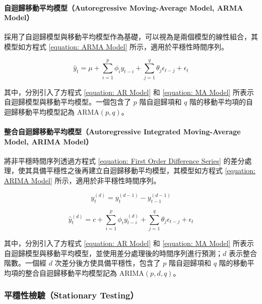 \paragraph{自迴歸移動平均模型（Autoregressive Moving-Average Model, ARMA Model）}

採用了自迴歸模型與移動平均模型作為基礎，可以視為是兩個模型的線性組合，其模型如方程式 \eqref{equation: ARMA Model} 所示，適用於平穩性時間序列。

\begin{equation}\label{equation: ARMA Model}
  \hat{y}_{t} = \mu + \sum_{i = 1}^{p} \phi_{i} y_{t-i} + \sum_{j = 1}^{q} \theta_{j} \epsilon_{t-j} + \epsilon_{t}
\end{equation}

其中，分別引入了方程式 \eqref{equation: AR Model} 和 \eqref{equation: MA Model} 所表示自迴歸模型與移動平均模型。一個包含了 $p$ 階自迴歸項和 $q$ 階的移動平均項的自迴歸移動平均模型記為 $\text{ARMA} (p, q)$。

\paragraph{整合自迴歸移動平均模型（Autoregressive Integrated Moving-Average Model, ARIMA Model）}

將非平穩時間序列透過方程式 \eqref{equation: First Order Difference Series} 的差分處理，使其具備平穩性之後再建立自迴歸移動平均模型，其模型如方程式 \eqref{equation: ARIMA Model} 所示，適用於非平穩性時間序列。

\begin{equation}\label{equation: First Order Difference Series}
  {y}_{t}^{(d)} = y_{t}^{(d-1)} - y_{t-1}^{(d-1)}
\end{equation}

\begin{equation}\label{equation: ARIMA Model}
  \hat{y}_{t}^{(d)} = c + \sum_{i = 1}^{p} \phi_{i} {y}_{t-i}^{(d)} + \sum_{j = 1}^{q} \theta_{j} \epsilon_{t-j} + \epsilon_{t}
\end{equation}

其中，分別引入了方程式 \eqref{equation: AR Model} 和 \eqref{equation: MA Model} 所表示自迴歸模型與移動平均模型，並使用差分處理後的時間序列進行預測；$d$ 表示整合階數。一個經 $d$ 次差分後方使具備平穩性，包含了 $p$ 階自迴歸項和 $q$ 階的移動平均項的整合自迴歸移動平均模型記為 $\text{ARIMA} (p, d, q)$。

\subsubsection{平穩性檢驗（Stationary Testing）}

